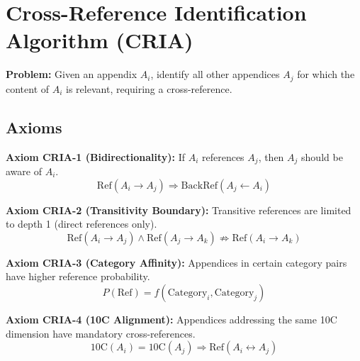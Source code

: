 \section{Cross-Reference Identification Algorithm (CRIA)}
\label{sec:bo-cria}

\begin{tcolorbox}[colback=red!5!white, colframe=red!75!black,
    title=Algorithm Specification]
\textbf{Problem:} Given an appendix $A_i$, identify all other appendices $A_j$
for which the content of $A_i$ is relevant, requiring a cross-reference.
\end{tcolorbox}

\subsection{Axioms}

\begin{tcolorbox}[colback=blue!5!white, colframe=blue!75!black]

\textbf{Axiom CRIA-1 (Bidirectionality):}
If $A_i$ references $A_j$, then $A_j$ should be aware of $A_i$.
\begin{equation}
\text{Ref}(A_i \rightarrow A_j) \Rightarrow \text{BackRef}(A_j \leftarrow A_i)
\end{equation}

\textbf{Axiom CRIA-2 (Transitivity Boundary):}
Transitive references are limited to depth 1 (direct references only).
\begin{equation}
\text{Ref}(A_i \rightarrow A_j) \land \text{Ref}(A_j \rightarrow A_k) \not\Rightarrow \text{Ref}(A_i \rightarrow A_k)
\end{equation}

\textbf{Axiom CRIA-3 (Category Affinity):}
Appendices in certain category pairs have higher reference probability.
\begin{equation}
P(\text{Ref}) = f(\text{Category}_i, \text{Category}_j)
\end{equation}

\textbf{Axiom CRIA-4 (10C Alignment):}
Appendices addressing the same 10C dimension have mandatory cross-references.
\begin{equation}
\text{10C}(A_i) = \text{10C}(A_j) \Rightarrow \text{Ref}(A_i \leftrightarrow A_j)
\end{equation}

\end{tcolorbox}


